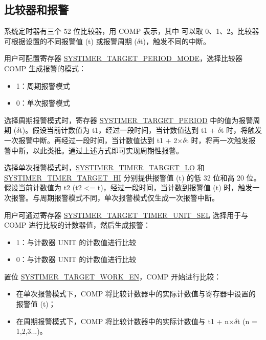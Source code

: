 \documentclass[main\_\_CN.tex]{subfiles}
\begin{document}
\subsection{比较器和报警}
系统定时器有三个 52 位比较器，用 COMP 表示，其中  可以取 0、1、2。比较器可根据设置的不同报警值 (t) 或报警周期 ($\delta$t)，触发不同的中断。

用户可配置寄存器 \hyperref[fielddesc:SYSTIMERTARGET0PERIODMODE]{SYSTIMER\_TARGET\_PERIOD\_MODE}，选择比较器 COMP 生成报警的模式：
\begin{itemize}
    \item 1：周期报警模式
    \item 0：单次报警模式
\end{itemize}

选择周期报警模式时，寄存器 \hyperref[fielddesc:SYSTIMERTARGET2PERIOD]{SYSTIMER\_TARGET\_PERIOD} 中的值为报警周期 ($\delta$t)。假设当前计数值为 t1，经过一段时间，当计数值达到 t1 + $\delta$t 时，将触发一次报警中断。再经过一段时间，当计数值达到 t1 + 2×$\delta$t 时，将再一次触发报警中断，以此类推。通过上述方式即可实现周期性报警。

选择单次报警模式时，\hyperref[fielddesc:SYSTIMERTIMERTARGET0LO]{SYSTIMER\_TIMER\_TARGET\_LO} 和 \hyperref[fielddesc:SYSTIMERTIMERTARGET0HI]{SYSTIMER\_TIMER\_TARGET\_HI} 分别提供报警值 (t) 的低 32 位和高 20 位。假设当前计数值为 t2 (t2 <= t)，经过一段时间，当计数到报警值 (t) 时，触发一次报警。与周期报警模式不同，单次报警模式仅生成一次报警中断。

用户可通过寄存器 \hyperref[fielddesc:SYSTIMERTARGET0TIMERUNITSEL]{SYSTIMER\_TARGET\_TIMER\_UNIT\_SEL} 选择用于与 COMP 进行比较的计数器值，然后生成报警：

\begin{itemize}
        \item 1：与计数器 UNIT 的计数值进行比较
        \item 0：与计数器 UNIT 的计数值进行比较
\end{itemize}

置位 \hyperref[fielddesc:SYSTIMERTARGET0WORKEN]{SYSTIMER\_TARGET\_WORK\_EN}，COMP 开始进行比较：
\begin{itemize}
    \item 在单次报警模式下，COMP 将比较计数器中的实际计数值与寄存器中设置的报警值 (t)；
    \item 在周期报警模式下，COMP 将比较计数器中的实际计数值与 t1 + n×$\delta$t (n = 1,2,3...)。
\end{itemize}
\end{document}
